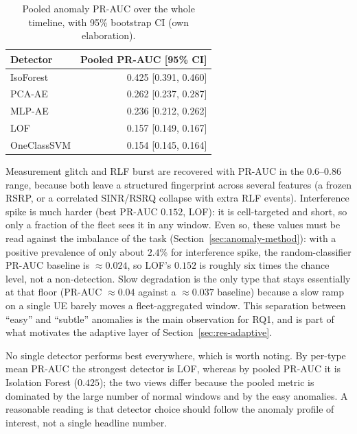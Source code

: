 \begin{table}[ht]
\centering
\caption{Pooled anomaly PR-AUC over the whole timeline, with 95\% bootstrap CI (own elaboration).}
\label{tab:anomaly-overall}
\begin{tabular}{@{}lr@{}}
\toprule
Detector & Pooled PR-AUC [95\% CI] \\
\midrule
IsoForest   & 0.425 [0.391, 0.460] \\
PCA-AE      & 0.262 [0.237, 0.287] \\
MLP-AE      & 0.236 [0.212, 0.262] \\
LOF         & 0.157 [0.149, 0.167] \\
OneClassSVM & 0.154 [0.145, 0.164] \\
\bottomrule
\end{tabular}
\end{table}

Measurement glitch and RLF burst are recovered with PR-AUC in the $0.6$--$0.86$
range, because both leave a structured fingerprint across several features (a
frozen RSRP, or a correlated SINR/RSRQ collapse with extra RLF events).
Interference spike is much harder (best PR-AUC $0.152$, LOF): it is cell-targeted
and short, so only a fraction of the fleet sees it in any window. Even so, these
values must be read against the imbalance of the task
(Section~\ref{sec:anomaly-method}): with a positive prevalence of only about
$2.4\%$ for interference spike, the random-classifier PR-AUC baseline is
$\approx 0.024$, so LOF's $0.152$ is roughly six times the chance level, not a
non-detection. Slow degradation is the only type that stays essentially at
that floor (PR-AUC $\approx 0.04$ against a $\approx 0.037$ baseline) because a
slow ramp on a single UE barely moves a fleet-aggregated window. This separation between
``easy'' and ``subtle'' anomalies is the main observation for RQ1, and is part of
what motivates the adaptive layer of Section~\ref{sec:res-adaptive}.

No single detector performs best everywhere, which is worth noting. By per-type
mean PR-AUC the strongest detector is LOF, whereas by pooled PR-AUC it is
Isolation Forest ($0.425$); the two views differ because the pooled metric is
dominated by the large number of normal windows and by the easy anomalies. A
reasonable reading is that detector choice should follow the anomaly profile of
interest, not a single headline number.

